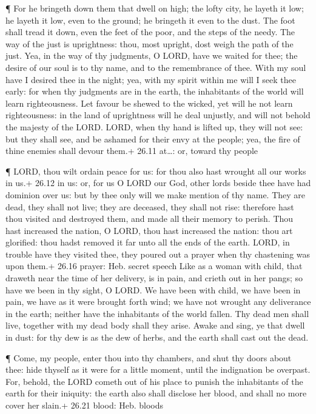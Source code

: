  ¶ For he bringeth down them that dwell on high; the lofty
city, he layeth it low; he layeth it low, even to the ground; he
bringeth it even to the dust.  The foot shall tread it down,
even the feet of the poor, and the steps of the needy.  The
way of the just is uprightness: thou, most upright, dost weigh the path
of the just.  Yea, in the way of thy judgments, O LORD, have
we waited for thee; the desire of our soul is to thy name, and to the
remembrance of thee.  With my soul have I desired thee in
the night; yea, with my spirit within me will I seek thee early: for
when thy judgments are in the earth, the inhabitants of the world will
learn righteousness.  Let favour be shewed to the wicked,
yet will he not learn righteousness: in the land of uprightness will he
deal unjustly, and will not behold the majesty of the LORD.
 LORD, when thy hand is lifted up, they will not see: but
they shall see, and be ashamed for their envy at the people; yea, the
fire of thine enemies shall devour them.+ 26.11 at\ldots: or, toward thy
people

 ¶ LORD, thou wilt ordain peace for us: for thou also hast
wrought all our works in us.+ 26.12 in us: or, for us  O
LORD our God, other lords beside thee have had dominion over us: but by
thee only will we make mention of thy name.  They are dead,
they shall not live; they are deceased, they shall not rise: therefore
hast thou visited and destroyed them, and made all their memory to
perish.  Thou hast increased the nation, O LORD, thou hast
increased the nation: thou art glorified: thou hadst removed it far unto
all the ends of the earth.  LORD, in trouble have they
visited thee, they poured out a prayer when thy chastening was upon
them.+ 26.16 prayer: Heb. secret speech  Like as a woman
with child, that draweth near the time of her delivery, is in pain, and
crieth out in her pangs; so have we been in thy sight, O LORD.
 We have been with child, we have been in pain, we have as
it were brought forth wind; we have not wrought any deliverance in the
earth; neither have the inhabitants of the world fallen. 
Thy dead men shall live, together with my dead body shall they arise.
Awake and sing, ye that dwell in dust: for thy dew is as the dew of
herbs, and the earth shall cast out the dead.

 ¶ Come, my people, enter thou into thy chambers, and shut
thy doors about thee: hide thyself as it were for a little moment, until
the indignation be overpast.  For, behold, the LORD cometh
out of his place to punish the inhabitants of the earth for their
iniquity: the earth also shall disclose her blood, and shall no more
cover her slain.+ 26.21 blood: Heb. bloods


